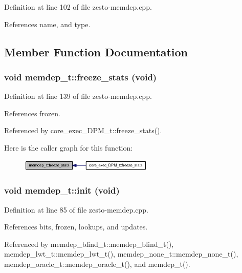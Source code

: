 Definition at line 102 of file zesto-memdep.cpp.

References name, and type.

\subsection{Member Function Documentation}
\subsubsection[{freeze\_\-stats}]{\setlength{\rightskip}{0pt plus 5cm}void memdep\_\-t::freeze\_\-stats (void)}\label{classmemdep__t_6a645b6566c350c8a76febb44b63d861}




Definition at line 139 of file zesto-memdep.cpp.

References frozen.

Referenced by core\_\-exec\_\-DPM\_\-t::freeze\_\-stats().

Here is the caller graph for this function:\nopagebreak
\begin{figure}[H]
\begin{center}
\leavevmode
\includegraphics[width=179pt]{classmemdep__t_6a645b6566c350c8a76febb44b63d861_icgraph}
\end{center}
\end{figure}
\subsubsection[{init}]{\setlength{\rightskip}{0pt plus 5cm}void memdep\_\-t::init (void)\hspace{0.3cm}{\tt  [protected]}}\label{classmemdep__t_0419e6a5f42e4c85015147aae9f48ce8}




Definition at line 85 of file zesto-memdep.cpp.

References bits, frozen, lookups, and updates.

Referenced by memdep\_\-blind\_\-t::memdep\_\-blind\_\-t(), memdep\_\-lwt\_\-t::memdep\_\-lwt\_\-t(), memdep\_\-none\_\-t::memdep\_\-none\_\-t(), memdep\_\-oracle\_\-t::memdep\_\-oracle\_\-t(), and memdep\_\-t().

